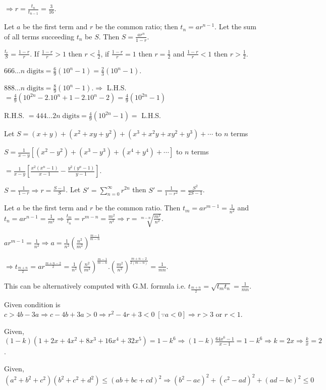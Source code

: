   $\Rightarrow r = \frac{t_n}{t_{n - 1}} = \frac{3}{16}$.
\item Let $a$ be the first term and $r$ be the common ratio; then $t_n = ar^{n -1}$. Let the sum of all
  terms succeeding $t_n$ be $S$. Then $S = \frac{ar^n}{1 - r}$.

  $\frac{t_r}{S} = \frac{1 - r}{r}$. If $\frac{1 - r}{r} > 1$ then $r < \frac{1}{2}$, if $\frac{1 - r}{r} =
  1$ then $r = \frac{1}{2}$ and $\frac{1 - r}{r} < 1$ then $r > \frac{1}{2}$.
\item $666\ldots n\;\mathrm{digits} = \frac{6}{9}(10^n - 1) = \frac{2}{3}(10^n - 1)$.

  $888\ldots n\;\mathrm{digits} = \frac{8}{9}(10^n - 1). \Rightarrow$ L.H.S. $= \frac{4}{9}(10^{2n} - 2.10^n + 1 -
  2.10^n -2) = \frac{4}{9}(10^{2n} - 1)$

  R.H.S. $= 444\ldots 2n\;\mathrm{digits} = \frac{4}{9}(10^{2n} - 1) =$ L.H.S.
\item Let $S = (x + y) + (x^2 + xy + y^2) + (x^3 + x^2y + xy^2 + y^3) + \cdots$ to $n$ terms

  $S = \frac{1}{x - y}[(x^2 - y^2) + (x^3 - y^3) + (x^4 + y^4) + \cdots]$ to $n$ terms

  $= \frac{1}{x - y}\left[\frac{x^2(x^n - 1)}{x - 1} - \frac{y^2(y^n - 1)}{y - 1}\right]$.
\item $S = \frac{1}{1 - r}\Rightarrow r = \frac{S - 1}{S}$. Let $S' =
  \displaystyle\sum_{n=0}^{\infty}r^{2n}$ then
  $S' = \frac{1}{1 - r^2} = \frac{S^2}{2S - 1}$.
\item Let $a$ be the first term and $r$ be the common ratio. Then $t_m = ar^{m - 1} = \frac{1}{n^2}$ and
  $t_n = ar^{n - 1} = \frac{1}{m^2} \Rightarrow \frac{t_m}{t_n} = r^{m - n} = \frac{m^2}{n^2} \Rightarrow r
  = \sqrt[m - n]{\frac{m^2}{n^2}}$.

  $ar^{m - 1} = \frac{1}{n^2} \Rightarrow a = \frac{1}{n^2}\left(\frac{n^2}{m^2}\right)^{\tfrac{m - 1}{m -
      n}}$

  $\Rightarrow t_{\tfrac{m + n}{2}} = ar^{\tfrac{m + n - 2}{2}} =
  \frac{1}{n^2}\left(\frac{n^2}{m^2}\right)^{\tfrac{m - 1}{m - n}}.\left(\frac{m^2}{n^2}\right)^{\tfrac{m +
      n -2}{2(m - n)}} = \frac{1}{mn}$.

  This can be alternatively computed with G.M. formula i.e. $t_{\tfrac{m + n}{2}} = \sqrt{t_mt_n} =
  \frac{1}{mn}$.
\item Given condition is $c > 4b - 3a \Rightarrow c - 4b + 3a > 0 \Rightarrow r^2 - 4r + 3 < 0\;[\because a
  < 0] \Rightarrow r> 3$ or $r < 1$.
\item Given, $(1 - k)(1 + 2x + 4x^2 + 8x^3 + 16x^4 + 32x^5) = 1 - k^6 \Rightarrow (1 - k)\frac{64x^6 - 1}{x
  - 1} = 1 - k^6 \Rightarrow k = 2x \Rightarrow \frac{k}{x} = 2$.
\item Given, $(a^2 + b^2 + c^2)(b^2 + c^2 + d^2)\leq(ab + bc + cd)^2 \Rightarrow (b^2 - ac)^2 + (c^2 - ad)^2
  + (ad - bc)^2 \leq 0$

